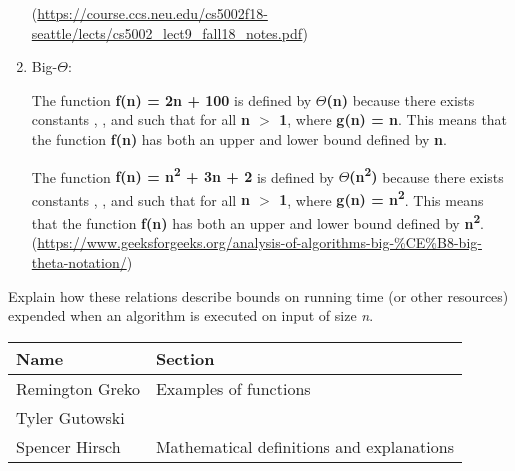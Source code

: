 \documentclass{article}
\begin{document}
\begin{enumerate}
        (\url{https://course.ccs.neu.edu/cs5002f18-seattle/lects/cs5002_lect9_fall18_notes.pdf})

        \smallskip

    \item Big-$\Theta$: \\
    
        \smallskip

        The function \textbf{f(n) = 2n + 100} is defined by \textbf{$\Theta$(n)} because there 
        exists constants , , and 
        such that for all \textbf{n $>$ 1}, 
        where \textbf{g(n) = n}. This means that the function \textbf{f(n)} has both an upper
        and lower bound defined by \textbf{n}.

        The function \textbf{f(n) = n\textsuperscript{2} + 3n + 2} is defined by 
        \textbf{$\Theta$(n\textsuperscript{2})} because there 
        exists constants , , and 
        such that for all \textbf{n $>$ 1}, 
        where \textbf{g(n) = n\textsuperscript{2}}. 
        This means that the function \textbf{f(n)} has both an upper
        and lower bound defined by \textbf{n\textsuperscript{2}}. \\

        (\url{https://www.geeksforgeeks.org/analysis-of-algorithms-big-%CE%B8-big-theta-notation/})

        \smallskip

\end{enumerate}

\medskip

\noindent Explain how these relations describe bounds on running time (or other resources)
expended when an algorithm is executed on input of size \textit{n}.

\pagebreak

\begin{center}
    \begin{tabular}{|p{3cm}|p{6cm}|}
        \hline
        \textbf{Name} & \textbf{Section} \\
        \hline
        Remington Greko &  Examples of functions\\
        \hline
        Tyler Gutowski &  \\
        \hline
        Spencer Hirsch & Mathematical definitions and explanations \\
        \hline
    \end{tabular}
\end{center}
\end{document}
